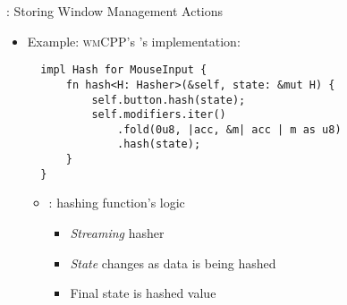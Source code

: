 \begin{frame}[fragile]{\underline{\cpp}: Storing Window Management Actions \hfill {\footnotesize \currentname}}


    \begin{itemize}

        \item Example: \textsc{wmCPP}'s 's  implementation:\\[3pt] 
\begin{verbatim}
  impl Hash for MouseInput {
      fn hash<H: Hasher>(&self, state: &mut H) {
          self.button.hash(state);
          self.modifiers.iter()
              .fold(0u8, |acc, &m| acc | m as u8)
              .hash(state);
      }
  }
\end{verbatim}

    \vspace*{5pt}\begin{itemize}

        \item {}: hashing function's logic
            \begin{itemize}
                \item \textit{Streaming} hasher
                \item \textit{State} changes as data is being hashed
                \item Final state is hashed value
            \end{itemize}

    \end{itemize}

    \end{itemize}

    \vfill

\end{frame}

